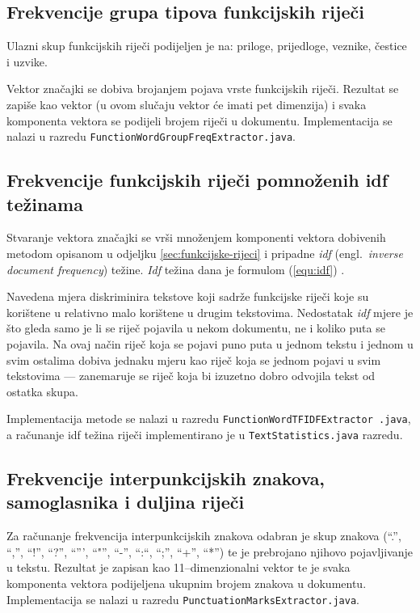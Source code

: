 \documentclass{article}
\newcommand{\engl}[1]{(engl.~\emph{#1})}
\begin{document}
\subsection{Frekvencije grupa tipova funkcijskih riječi}
Ulazni skup funkcijskih riječi podijeljen je na: priloge, prijedloge, veznike,
čestice i uzvike.

Vektor značajki se dobiva brojanjem pojava vrste funkcijskih riječi. Rezultat
se zapiše kao vektor (u ovom slučaju vektor će imati pet dimenzija) i svaka
komponenta vektora se podijeli brojem riječi u dokumentu. Implementacija se
nalazi u razredu \texttt{FunctionWordGroupFreqExtractor.java}.

\subsection{Frekvencije funkcijskih riječi pomnoženih idf težinama}
Stvaranje vektora značajki se vrši množenjem komponenti vektora dobivenih metodom
opisanom u odjeljku \ref{sec:funkcijske-rijeci} i pripadne \emph{idf} \engl{inverse
document frequency} težine. \emph{Idf} težina dana je formulom (\ref{equ:idf})
\citep{diederich2003authorship}.

Navedena mjera diskriminira tekstove koji sadrže funkcijske riječi koje su
korištene u relativno malo korištene u drugim tekstovima. Nedostatak \emph{idf}
mjere je što gleda samo je li se riječ pojavila u nekom dokumentu, ne i koliko
puta se pojavila. Na ovaj način riječ koja se pojavi puno puta u jednom
tekstu i jednom u svim ostalima dobiva jednaku mjeru kao riječ koja se jednom
pojavi u svim tekstovima --- zanemaruje se riječ koja bi izuzetno dobro
odvojila tekst od ostatka skupa.

Implementacija metode se nalazi u razredu
\texttt{FunctionWordTFIDFExtractor .java}, a računanje idf težina riječi
implementirano je u \texttt{TextStatistics.java} razredu.


\subsection{Frekvencije interpunkcijskih znakova, samoglasnika i duljina riječi}
Za računanje frekvencija interpunkcijskih znakova odabran je skup znakova (``.'',
``,'', ``!'', ``?'', ``''', ``"'', ``-'', ``:``, ``;'', ``+'', ``*'') te je
prebrojano njihovo pojavljivanje u tekstu. Rezultat je zapisan kao
11--dimenzionalni vektor te je svaka komponenta vektora podijeljena ukupnim
brojem znakova u dokumentu. Implementacija se nalazi u razredu
\texttt{PunctuationMarksExtractor.java}.
\end{document}
